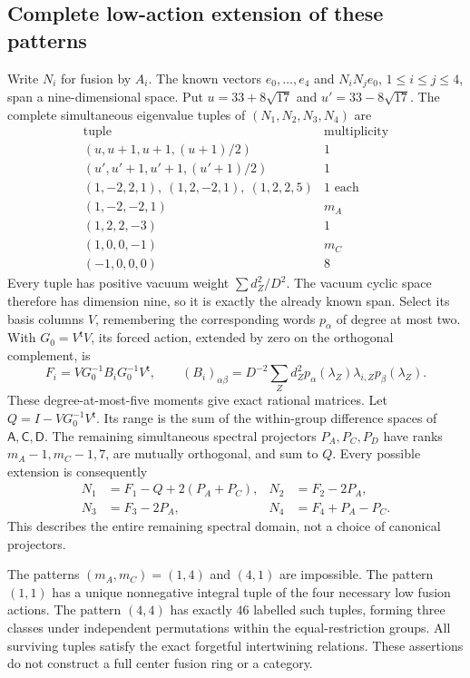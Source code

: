 \subsection{Complete low-action extension of these patterns}

Write $N_i$ for fusion by $A_i$.  The known vectors
$e_0,\ldots,e_4$ and $N_iN_je_0$, $1\le i\le j\le4$, span a
nine-dimensional space.  Put $u=33+8\sqrt{17}$ and
$u'=33-8\sqrt{17}$.  The complete simultaneous eigenvalue tuples of
$(N_1,N_2,N_3,N_4)$ are
\[
\begin{array}{c|c}
\text{tuple}&\text{multiplicity}\\\hline
(u,u+1,u+1,(u+1)/2)&1\\
(u',u'+1,u'+1,(u'+1)/2)&1\\
(1,-2,2,1),\ (1,2,-2,1),\ (1,2,2,5)&1\text{ each}\\
(1,-2,-2,1)&m_A\\
(1,2,2,-3)&1\\
(1,0,0,-1)&m_C\\
(-1,0,0,0)&8
\end{array}
\]
Every tuple has positive vacuum weight $\sum d_Z^2/D^2$.
The vacuum cyclic space therefore has dimension nine, so it is exactly
the already known span.  Select its basis columns $V$, remembering
the corresponding words $p_\alpha$ of degree at most two.  With
$G_0=V^{\mathsf t}V$, its forced action, extended by zero on the
orthogonal complement, is
\[
 F_i=VG_0^{-1}B_iG_0^{-1}V^{\mathsf t},\qquad
 (B_i)_{\alpha\beta}=D^{-2}\sum_Zd_Z^2
 p_\alpha(\lambda_Z)\lambda_{i,Z}p_\beta(\lambda_Z).
\]
These degree-at-most-five moments give exact rational matrices.
Let $Q=I-VG_0^{-1}V^{\mathsf t}$.  Its range is the sum of the
within-group difference spaces of $\mathsf A,\mathsf C,\mathsf D$.
The remaining simultaneous spectral projectors $P_A,P_C,P_D$ have
ranks $m_A-1,m_C-1,7$, are mutually orthogonal, and sum to $Q$.
Every possible extension is consequently
\begin{equation}\label{eq:followup-hidden-actions}
\begin{aligned}
N_1&=F_1-Q+2(P_A+P_C),&N_2&=F_2-2P_A,\\
N_3&=F_3-2P_A,&N_4&=F_4+P_A-P_C.
\end{aligned}
\end{equation}
This describes the entire remaining spectral domain, not a choice of
canonical projectors.

\begin{proposition}\label{prop:r721-action-extension}
The patterns $(m_A,m_C)=(1,4)$ and $(4,1)$ are impossible.
The pattern $(1,1)$ has a unique nonnegative integral tuple of the four
necessary low fusion actions.  The pattern $(4,4)$ has exactly $46$
labelled such tuples, forming three classes under independent
permutations within the equal-restriction groups.
All surviving tuples satisfy the exact forgetful intertwining relations.
These assertions do not construct a full center fusion ring or a category.
\end{proposition}

